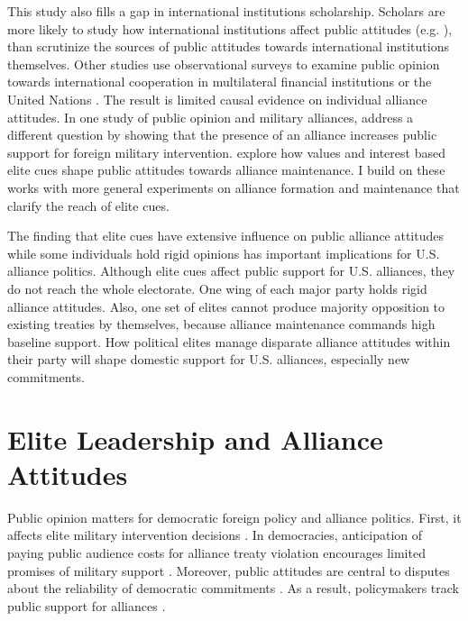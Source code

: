 \documentclass[12pt]{article}
\begin{document}
This study also fills a gap in international institutions scholarship. 
Scholars are more likely to study how international institutions affect public attitudes (e.g. \cite{Griecoetal2011, KayaWalker2014, Greenhill2020, RecchiaChu2021}), than scrutinize the sources of public attitudes towards international institutions themselves. 
Other studies use observational surveys to examine public opinion towards international cooperation in multilateral financial institutions \citep{Edwards2009} or the United Nations \citep{Torgler2008, DellmuthTallberg2015}. 
The result is limited causal evidence on individual alliance attitudes.
In one study of public opinion and military alliances, \citet{TomzWeeks2021} address a different question by showing that the presence of an alliance increases public support for foreign military intervention. 
\citet{Chuetal2021} explore how values and interest based elite cues shape public attitudes towards alliance maintenance. 
I build on these works with more general experiments on alliance formation and maintenance that clarify the reach of elite cues.


The finding that elite cues have extensive influence on public alliance attitudes while some individuals hold rigid opinions has important implications for U.S. alliance politics. 
Although elite cues affect public support for U.S. alliances, they do not reach the whole electorate.
One wing of each major party holds rigid alliance attitudes.
Also, one set of elites cannot produce majority opposition to existing treaties by themselves, because alliance maintenance commands high baseline support. 
How political elites manage disparate alliance attitudes within their party will shape domestic support for U.S. alliances, especially new commitments.



\section{Elite Leadership and Alliance Attitudes}


Public opinion matters for democratic foreign policy and alliance politics.
First, it affects elite military intervention decisions \citep{Tomzetal2020, LinGreenberg2021}. 
In democracies, anticipation of paying public audience costs for alliance treaty violation encourages limited promises of military support \citep{Chibaetal2015, FjelstulReiter2019}. 
Moreover, public attitudes are central to disputes about the reliability of democratic commitments \citep{Gaubatz1996, GartzkeGleditsch2004}. 
As a result, policymakers track public support for alliances \citep{Sayle2019}. 
\end{document}
